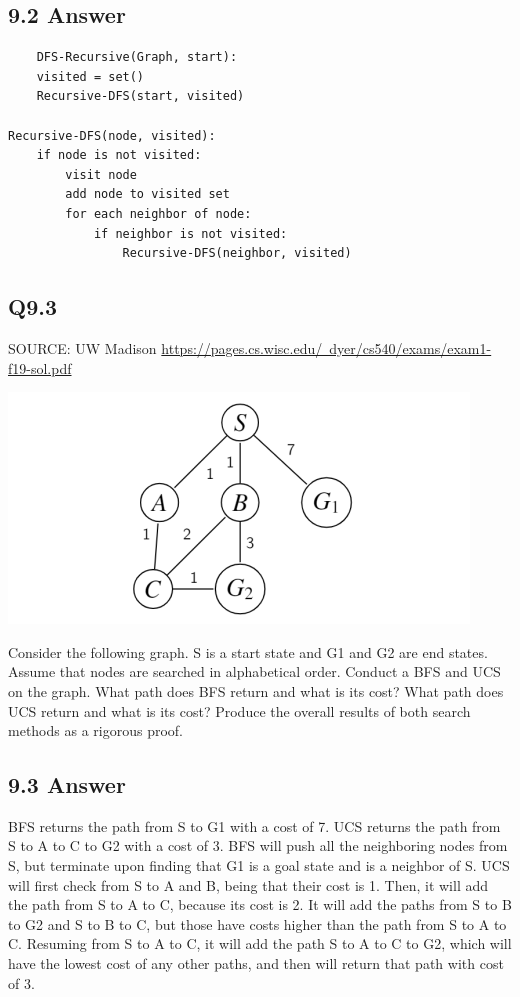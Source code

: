 \documentclass{article}
\begin{document}
\subsection*{9.2 Answer}
\begin{verbatim}
    DFS-Recursive(Graph, start):
    visited = set()
    Recursive-DFS(start, visited)

Recursive-DFS(node, visited):
    if node is not visited:
        visit node
        add node to visited set
        for each neighbor of node:
            if neighbor is not visited:
                Recursive-DFS(neighbor, visited)
\end{verbatim}

\subsection*{Q9.3}
SOURCE: UW Madison \href{https://pages.cs.wisc.edu/~dyer/cs540/exams/exam1-f19-sol.pdf}{https://pages.cs.wisc.edu/~dyer/cs540/exams/exam1-f19-sol.pdf}

\includegraphics{UCS_question_graph.png}

Consider the following graph. S is a start state and G1 and G2 are end states. Assume that nodes are searched in alphabetical order. Conduct a BFS and UCS on the graph.
What path does BFS return and what is its cost? What path does UCS return and what is its cost? Produce the overall
results of both search methods as a rigorous proof.

\subsection*{9.3 Answer}
BFS returns the path from S to G1 with a cost of 7. UCS returns the path from S to A to C to G2 with a cost of 3. BFS will push all the neighboring nodes
from S, but terminate upon finding that G1 is a goal state and is a neighbor of S. UCS will first check from S to A and B, being that their cost is 1.
Then, it will add the path from S to A to C, because its cost is 2. It will add the paths from S to B to G2 and S to B to C, but those have costs higher
than the path from S to A to C. Resuming from S to A to C, it will add the path S to A to C to G2, which will have the lowest cost of any other paths, 
and then will return that path with cost of 3. 
\end{document}
